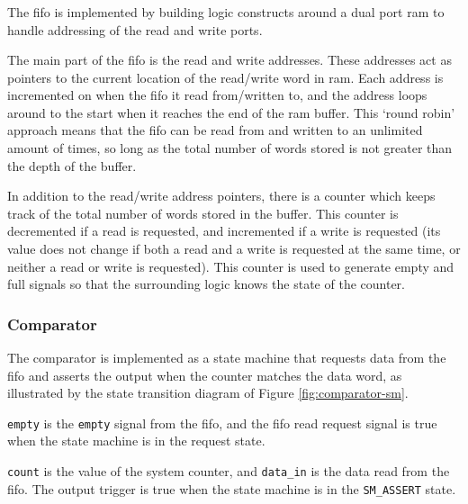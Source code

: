 \subsubsection{}
The \gls{fifo} is implemented by building logic constructs around a dual port \gls{ram} to handle addressing of the read and write ports.

The main part of the \gls{fifo} is the read and write addresses. These addresses act as pointers to the current location of the read/write word in \gls{ram}. Each address is incremented on when the \gls{fifo} it read from/written to, and the address loops around to the start when it reaches the end of the \gls{ram} buffer. This `round robin' approach means that the \gls{fifo} can be read from and written to an unlimited amount of times, so long as the total number of words stored is not greater than the depth of the buffer.

In addition to the read/write address pointers, there is a counter which keeps track of the total number of words stored in the buffer. This counter is decremented if a read is requested, and incremented if a write is requested (its value does not change if both a read and a write is requested at the same time, or neither a read or write is requested). This counter is used to generate empty and full signals so that the surrounding logic knows the state of the counter.

\subsubsection{Comparator}
The comparator is implemented as a state machine that requests data from the \gls{fifo} and asserts the output when the counter matches the data word, as illustrated by the state transition diagram of Figure \ref{fig:comparator-sm}.

\texttt{empty} is the \texttt{empty} signal from the \gls{fifo}, and the \gls{fifo} read request signal is true when the state machine is in the request state.

\texttt{count} is the value of the system counter, and \texttt{data\_in} is the data read from the \gls{fifo}. The output trigger is true when the state machine is in the \texttt{SM\_ASSERT} state.

